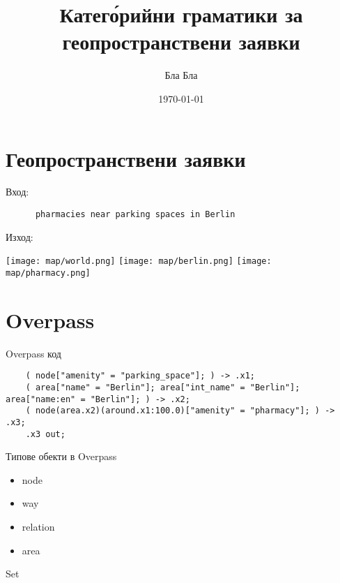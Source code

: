 \documentclass[10pt]{beamer}
\title{Катег\'орийни граматики за геопространствени заявки}
\date{\today}
\author{Бла Бла}
\institute{Магистър университет ФМИ бла}
\begin{document}
  \maketitle

  \section{Геопространствени заявки}
  \begin{frame}[fragile]
    Вход:
    \begin{lstwrap}\begin{lstlisting}
      pharmacies near parking spaces in Berlin
    \end{lstlisting}\end{lstwrap}
    Изход:

    \texttt{[image: map/world.png]}
    \hfill
    \texttt{[image: map/berlin.png]}
    \hfill
    \texttt{[image: map/pharmacy.png]}
  \end{frame}

  \section{Overpass}
  \begin{frame}[fragile]{Overpass код}
    \begin{lstwrap}\begin{lstlisting}
    ( node["amenity" = "parking_space"]; ) -> .x1;
    ( area["name" = "Berlin"]; area["int_name" = "Berlin"]; area["name:en" = "Berlin"]; ) -> .x2;
    ( node(area.x2)(around.x1:100.0)["amenity" = "pharmacy"]; ) -> .x3;
    .x3 out;
    \end{lstlisting}\end{lstwrap}
  \end{frame}

  \begin{frame}{Типове обекти в Overpass}
    \begin{itemize}
      \item node
      \item way
      \item relation
      \item area
    \end{itemize}
  \end{frame}

  \begin{frame}{Set}

  \end{frame}
\end{document}
